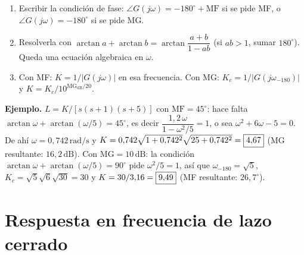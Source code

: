 \documentclass[11pt,a4paper]{article}
\newcommand{\rta}[1]{\fbox{$\displaystyle #1$}}
\newcommand{\dB}{\,\mathrm{dB}}
\newcommand{\rads}{\,\mathrm{rad/s}}
\newcommand{\jw}{j\omega}
\newcommand{\MF}{\mathrm{MF}}
\newcommand{\MG}{\mathrm{MG}}
\newcommand{\wf}{\omega_{-180}}
\begin{document}
\begin{receta}
\begin{enumerate}[label=\textbf{\arabic*.}]
\item Escribir la condición de fase: $\angle G(\jw)=-180^\circ+\MF$ si se pide MF, o $\angle G(\jw)=-180^\circ$ si se pide MG.
\item Resolverla con $\arctan a+\arctan b=\arctan\dfrac{a+b}{1-ab}$ (si $ab>1$, sumar $180^\circ$). Queda una ecuación algebraica en $\omega$.
\item Con MF: $K=1/|G(\jw)|$ en esa frecuencia. Con MG: $K_c=1/|G(j\wf)|$ y $K=K_c/10^{\MG_{\mathrm{dB}}/20}$.
\end{enumerate}
\textbf{Ejemplo.} $L=K/[s(s+1)(s+5)]$ con $\MF=45^\circ$: hace falta $\arctan\omega+\arctan(\omega/5)=45^\circ$, es decir
$\dfrac{1{,}2\,\omega}{1-\omega^2/5}=1$, o sea $\omega^2+6\omega-5=0$. De ahí $\omega=0{,}742\rads$ y
$K=0{,}742\sqrt{1+0{,}742^2}\sqrt{25+0{,}742^2}=\rta{4{,}67}$ (MG resultante: $16{,}2\dB$).
Con $\MG=10\dB$: la condición $\arctan\omega+\arctan(\omega/5)=90^\circ$ pide $\omega^2/5=1$, así que $\wf=\sqrt5$,
$K_c=\sqrt5\sqrt6\sqrt{30}=30$ y $K=30/3{,}16=\rta{9{,}49}$ (MF resultante: $26{,}7^\circ$).
\end{receta}

\section{Respuesta en frecuencia de lazo cerrado}
\end{document}
